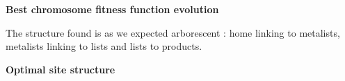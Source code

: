 \documentclass{iSWAGArticle}
\begin{document}
  \begin{center}
  \end{center}
  \begin{center}
  \textbf{\large Best chromosome fitness function evolution}
  \end{center}
  \begin{center}
  \end{center}
  The structure found is as we expected arborescent : home linking to metalists, metalists linking to lists and lists to products.
  \begin{center}
  \textbf{\large Optimal site structure}
  \end{center}
  \begin{center}
  \end{center}
\end{document}
